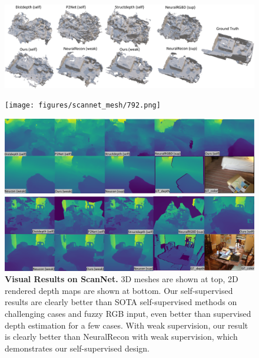 \begin{figure}
\begin{minipage}{\textwidth}
  \centerline{\includegraphics[width=1.0\textwidth]{figures/scannet_mesh/738.png}}
\end{minipage}
\vfill
\vspace{-3mm}
\begin{minipage}{\linewidth}
  \centerline{\texttt{[image: figures/scannet\_mesh/792.png]}}
\end{minipage}
\vfill
\vspace{-8mm}
\begin{minipage}{\linewidth}
  \centerline{\includegraphics[width=1.0\textwidth]{figures/scannet_depth/738_1200.png}}
\end{minipage}

\begin{minipage}{\linewidth}
  \centerline{\includegraphics[width=1.0\textwidth]{figures/scannet_depth/747_1740.png}}
\end{minipage}
\vspace{-3mm}
\caption{\textbf{Visual Results on ScanNet.} 3D meshes are shown at top, 2D rendered depth maps are shown at bottom. Our self-supervised results are clearly better than SOTA self-supervised methods on challenging cases and fuzzy RGB input, even better than supervised depth estimation for a few cases. With weak supervision, our result is clearly better than NeuralRecon with weak supervision, which demonstrates our self-supervised design.}
\label{fig:visual results}
\end{figure}